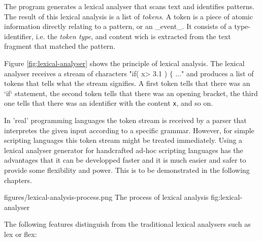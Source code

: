 The {\quex} program generates a lexical analyser that scans text and
identifies patterns. The result of this lexical analysis is a list of {\it
  tokens}. A token is a piece of atomic information directly relating to a
pattern, or an _event_. It consists of a type-identifier, i.e. the {\it
  token type}, and content wich is extracted from the text fragment that
matched the pattern. 

Figure \ref{fig:lexical-analyser} shows the principle of lexical
analysis.  The lexical analyser receives a stream of characters "if( x> 3.1 )
$\{$ ..." and produces a list of tokens that tells what the stream signifies. A first
  token tells that there was an `if` statement, the second token tells
  that there was an opening bracket, the third one tells that there was an
  identifier with the content {\tt x}, and so on. 
  
  In 'real' programming languages the token stream is received by a parser
  that interpretes the given input according to a specific grammar. However,
  for simple scripting languages this token stream might be treated
  immediately. Using a lexical analyser generator for handcrafted ad-hoc
  scripting languages has the advantages that it can be developped faster and
  it is much easier and safer to provide some flexibility and power. This is
  to be demonstrated in the following chapters.

\showpic
{figures/lexical-analysis-process.png}
{The process of lexical analysis}
{fig:lexical-analyser}

The following features distinguish {\quex} from the traditional lexical
analysers such as lex or flex:

